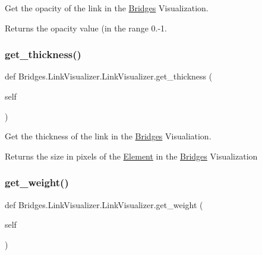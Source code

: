 Get the opacity of the link in the \mbox{\hyperlink{namespace_bridges_1_1_bridges}{Bridges}} Visualization. 

\begin{DoxyReturn}{Returns}
the opacity value (in the range 0.-\/1. 
\end{DoxyReturn}
\mbox{\label{class_bridges_1_1_link_visualizer_1_1_link_visualizer_a40b1bda03f571e9699ea82e3b5091df2}} 
\subsubsection{\texorpdfstring{get\+\_\+thickness()}{get\_thickness()}}
{\footnotesize\ttfamily def Bridges.\+Link\+Visualizer.\+Link\+Visualizer.\+get\+\_\+thickness (\begin{DoxyParamCaption}\item[{}]{self }\end{DoxyParamCaption})}



Get the thickness of the link in the \mbox{\hyperlink{namespace_bridges_1_1_bridges}{Bridges}} Visualiation. 

\begin{DoxyReturn}{Returns}
the size in pixels of the \mbox{\hyperlink{namespace_bridges_1_1_element}{Element}} in the \mbox{\hyperlink{namespace_bridges_1_1_bridges}{Bridges}} Visualization 
\end{DoxyReturn}
\mbox{\label{class_bridges_1_1_link_visualizer_1_1_link_visualizer_af99568cc9d12689dd46a90aaa633c3be}} 
\subsubsection{\texorpdfstring{get\+\_\+weight()}{get\_weight()}}
{\footnotesize\ttfamily def Bridges.\+Link\+Visualizer.\+Link\+Visualizer.\+get\+\_\+weight (\begin{DoxyParamCaption}\item[{}]{self }\end{DoxyParamCaption})}



